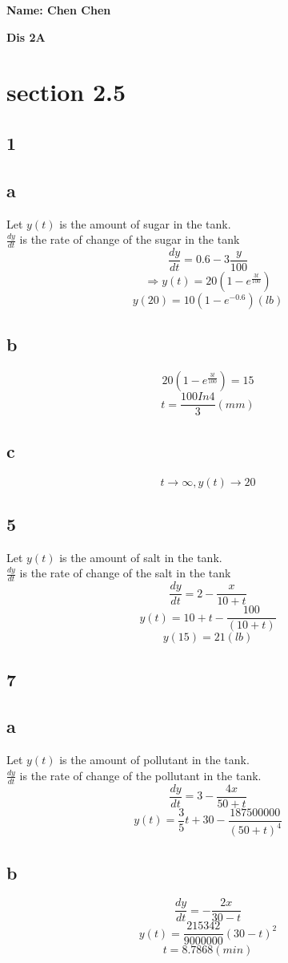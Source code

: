 \documentclass[12pt, a4paper]{IEEEtran}
\begin{document}
    \centerline{\textbf{Name: Chen Chen}}
    
    \centerline{\textbf{Dis 2A}}
\section *{section 2.5}
\subsection*{1}

\subsection*{a}
Let $y(t)$ is the amount of sugar in the tank.\\
$\frac{dy}{dt}$ is the rate of change of the sugar in the tank
$$\frac{dy}{dt}=0.6-3\frac{y}{100}$$
$$\Rightarrow y(t)=20(1-e^{\frac{3t}{100}})$$
$$y(20)=10(1-e^{-0.6})(lb)$$

\subsection*{b}
$$20(1-e^{\frac{3t}{100}})=15$$
$$t=\frac{100In4}{3}(mm)$$ 

\subsection*{c}
$$t\rightarrow \infty, y(t)\rightarrow 20$$

\subsection*{5}
Let $y(t)$ is the amount of salt in the tank.\\
$\frac{dy}{dt}$ is the rate of change of the salt in the tank
$$\frac{dy}{dt}=2-\frac{x}{10+t}$$
$$y(t)=10+t-\frac{100}{(10+t)}$$
$$y(15)=21(lb)$$

\subsection*{7}
\subsection*{a}
Let $y(t)$ is the amount of pollutant in the tank.\\
$\frac{dy}{dt}$ is the rate of change of the pollutant in the tank.
$$\frac{dy}{dt}=3-\frac{4x}{50+t}$$
$$y(t)=\frac{3}{5}t+30-\frac{187500000}{(50+t)^4}$$
\subsection*{b}
$$\frac{dy}{dt}=-\frac{2x}{30-t}$$
$$y(t)=\frac{215342}{9000000}(30-t)^2$$
$$t=8.7868(min)$$
\end{document}
